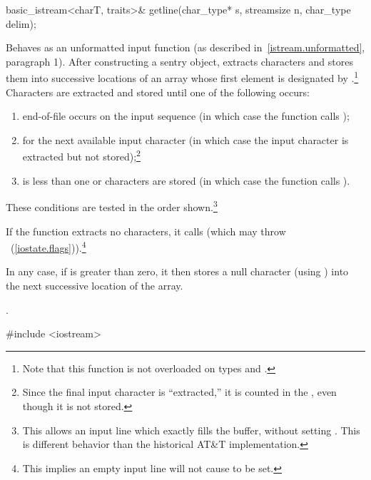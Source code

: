 %
\begin{itemdecl}
basic_istream<charT, traits>& getline(char_type* s, streamsize n,
                                      char_type delim);
\end{itemdecl}

\begin{itemdescr}
\pnum
\effects
Behaves as an unformatted input function
(as described in~\ref{istream.unformatted}, paragraph 1).
After constructing a sentry object, extracts
characters and stores them
into successive locations of an array whose first element is designated by
.\footnote{Note that this function is not overloaded on types
and
.}
Characters are extracted and stored until one of the following occurs:
\begin{enumerate}
\item
end-of-file occurs on the input sequence
(in which case the function calls
);
\item
{}
for the next available input
character 
(in which case the input character is extracted but not stored);\footnote{Since
the final input character is ``extracted,''
it is counted in the
,
even though it is not stored.}
\item
{} is less than one or 
characters are stored
(in which case the function calls
).
\end{enumerate}

\pnum
These conditions are tested in the order shown.\footnote{This allows an input
line which exactly fills the buffer, without setting
.
This is different behavior than the historical AT\&T implementation.}

\pnum
If the function extracts no characters, it calls
(which may throw
~(\ref{iostate.flags})).\footnote{This implies an
empty input line will not cause
to be set.}

\pnum
In any case, if  is greater than zero, it then stores a null character
(using
)
into the next successive location of the array.

\pnum
\returns
{}.

\pnum
\begin{example}
\begin{codeblock}
#include <iostream>


\end{codeblock}
\end{example}
\end{itemdescr}
